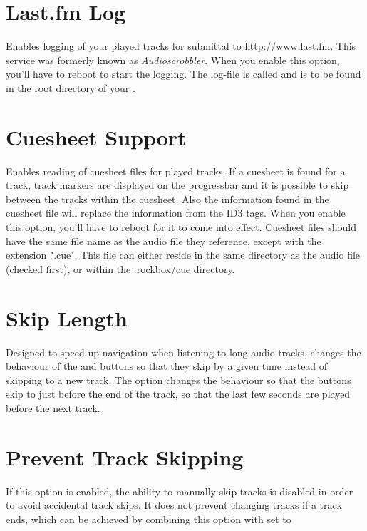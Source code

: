 \section{Last.fm Log}
  Enables logging of your played tracks for submittal to 
  \url{http://www.last.fm}. This service was formerly known as 
  \emph{Audioscrobbler}. When you enable this option, you'll have to reboot to
  start the logging. The log-file is called 
  and is to be found in the root directory of your \dap{}.\\


\section{Cuesheet Support}
  Enables reading of cuesheet files for played tracks. If a cuesheet is found
  for a track, track markers are displayed on the progressbar and it is
  possible to skip between the tracks within the cuesheet. Also the information
  found in the cuesheet file will replace the information from the ID3 tags.
  When you enable this option, you'll have to reboot for it to come into
  effect.
  Cuesheet files should have the same file name as the audio file they
  reference, except with the extension ".cue". This file can either reside in
  the same directory as the audio file (checked first), or within the
  .rockbox/cue directory.
  
\section{Skip Length}
  Designed to speed up navigation when listening to long audio tracks,
   changes the behaviour of
  the \ActionWpsSkipPrev{} and \ActionWpsSkipNext{} buttons so that they skip
  by a given time instead of skipping to a new track.
  The  option changes the behaviour so that the buttons
  skip to just before the end of the track, so that the last few seconds are
  played before the next track.

\section{Prevent Track Skipping}
  If this option is enabled, the ability to manually skip tracks is disabled
  in order to avoid accidental track skips. It does not prevent changing tracks
  if a track ends, which can be achieved by combining this option with
   set to 

